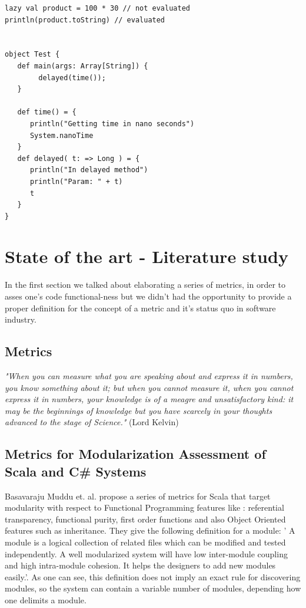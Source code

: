 \documentclass{article}
\begin{document}
\begin{lstlisting}
lazy val product = 100 * 30 // not evaluated
println(product.toString) // evaluated 


object Test {
   def main(args: Array[String]) {
        delayed(time());
   }

   def time() = {
      println("Getting time in nano seconds")
      System.nanoTime
   }
   def delayed( t: => Long ) = {
      println("In delayed method")
      println("Param: " + t)
      t
   }
}

\end{lstlisting}

\section {State of the art - Literature study}
In the first section we talked about elaborating a series of metrics, in order to asses one's code functional-ness but we didn't had the opportunity to provide a proper definition for the concept of a metric and it's status quo in software industry. 
\subsection{Metrics}
\textit{"When you can measure what you are speaking about and express it in numbers, you know something about it; but when you cannot measure it, when you cannot express it in numbers, your knowledge is of a meagre and unsatisfactory kind: it may be the beginnings of knowledge but you have scarcely in your thoughts advanced to the stage of Science."} (Lord Kelvin)

\subsection{Metrics for Modularization Assessment of Scala and C\# Systems }

Basavaraju Muddu et. al. \cite{DBLP:conf/icse/MudduABP13} propose a series of metrics for Scala that target modularity with respect to Functional Programming features like : referential transparency, functional purity, first order functions and also Object Oriented features such as inheritance. They give the following definition for a module: ' A module is a logical collection of related files which can be modified and tested independently. A well modularized system will have low inter-module coupling and high intra-module cohesion. It helps the designers to add new modules easily.'\cite{DBLP:conf/icse/MudduABP13}. As one can see, this definition does not imply an exact rule for discovering  modules, so the system can contain a variable number of modules, depending how one delimits a module. \par
\end{document}
